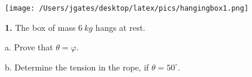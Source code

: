 
\begin{floatingfigure}[r]{.2\textwidth}
\texttt{[image: /Users/jgates/desktop/latex/pics/hangingbox1.png]}
\end{floatingfigure}
 
{\bf \Large{1.}} The box of mass ${6~kg}$ hangs at rest. 

\bigskip

\indent  a. Prove that ${\theta = \varphi}$.

\vfill

b. Determine the tension in the rope, if ${\theta = 50^\circ}$.

\vfill

\newpage
